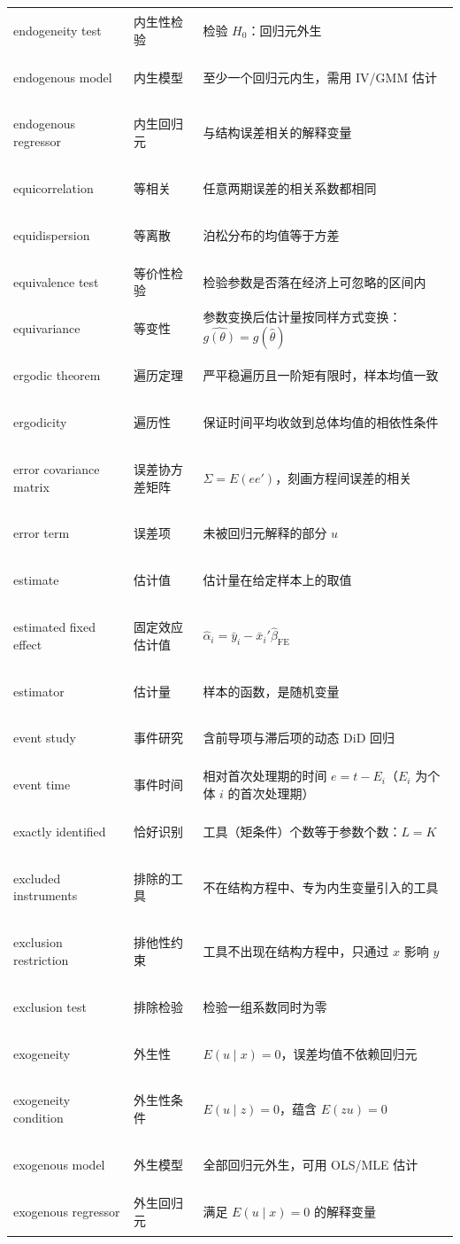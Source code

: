 \begin{longtable}{@{}>{\bfseries\boldmath\raggedright\arraybackslash}p{4.6cm}>{\raggedright\arraybackslash}p{3.2cm}>{\raggedright\arraybackslash}p{\dimexpr\textwidth-7.8cm-4\tabcolsep\relax}@{}}
endogeneity test & 内生性检验 & 检验 $H_0$：回归元外生 \\
endogenous model & 内生模型 & 至少一个回归元内生，需用 IV/GMM 估计 \\
endogenous regressor & 内生回归元 & 与结构误差相关的解释变量 \\
equicorrelation & 等相关 & 任意两期误差的相关系数都相同 \\
equidispersion & 等离散 & 泊松分布的均值等于方差 \\
equivalence test & 等价性检验 & 检验参数是否落在经济上可忽略的区间内 \\
equivariance & 等变性 & 参数变换后估计量按同样方式变换：$\widehat{g(\theta)}=g(\hat\theta)$ \\
ergodic theorem & 遍历定理 & 严平稳遍历且一阶矩有限时，样本均值一致 \\
ergodicity & 遍历性 & 保证时间平均收敛到总体均值的相依性条件 \\
error covariance matrix & 误差协方差矩阵 & $\Sigma=E(ee')$，刻画方程间误差的相关 \\
error term & 误差项 & 未被回归元解释的部分 $u$ \\
estimate & 估计值 & 估计量在给定样本上的取值 \\
estimated fixed effect & 固定效应估计值 & $\hat\alpha_i=\bar y_i-\bar x_i'\hat\beta_{\mathrm{FE}}$ \\
estimator & 估计量 & 样本的函数，是随机变量 \\
event study & 事件研究 & 含前导项与滞后项的动态 DiD 回归 \\
event time & 事件时间 & 相对首次处理期的时间 $e=t-E_i$（$E_i$ 为个体 $i$ 的首次处理期） \\
exactly identified & 恰好识别 & 工具（矩条件）个数等于参数个数：$L=K$ \\
excluded instruments & 排除的工具 & 不在结构方程中、专为内生变量引入的工具 \\
exclusion restriction & 排他性约束 & 工具不出现在结构方程中，只通过 $x$ 影响 $y$ \\
exclusion test & 排除检验 & 检验一组系数同时为零 \\
exogeneity & 外生性 & $E(u\mid x)=0$，误差均值不依赖回归元 \\
exogeneity condition & 外生性条件 & $E(u\mid z)=0$，蕴含 $E(zu)=0$ \\
exogenous model & 外生模型 & 全部回归元外生，可用 OLS/MLE 估计 \\
exogenous regressor & 外生回归元 & 满足 $E(u\mid x)=0$ 的解释变量 \\

\end{longtable}
